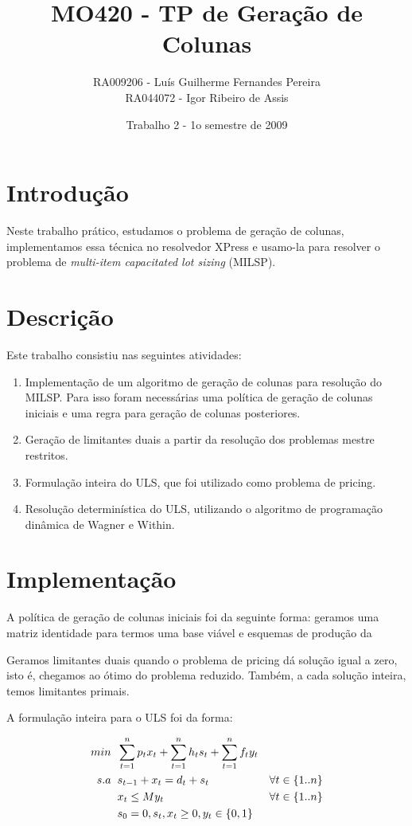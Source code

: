 \documentclass[letterpaper,11pt]{article}
\title{MO420 - TP de Geração de Colunas}
\author{RA009206 - Luís Guilherme Fernandes Pereira \\
RA044072 - Igor Ribeiro de Assis}
\date{Trabalho 2 - 1o semestre de 2009}
\begin{document}
\maketitle

\section{Introdução}

Neste trabalho prático, estudamos o problema de geração de colunas,
implementamos essa técnica no resolvedor XPress e usamo-la para resolver
o problema de \emph{multi-item capacitated lot sizing} (MILSP).

\section{Descrição}
Este trabalho consistiu nas seguintes atividades:

\begin{enumerate}
 \item Implementação de um algoritmo de geração de colunas para
       resolução do MILSP. Para isso foram necessárias uma política de 
       geração de colunas iniciais e uma regra para geração de colunas
       posteriores.
 \item Geração de limitantes duais a partir da resolução dos problemas
       mestre restritos.
 \item Formulação inteira do ULS, que foi utilizado como problema de
       pricing.
 \item Resolução determinística do ULS, utilizando o algoritmo de
       programação dinâmica de Wagner e Within. 
\end{enumerate}

\section{Implementação}
A política de geração de colunas iniciais foi da seguinte forma: geramos
uma matriz identidade para termos uma base viável e esquemas de produção da

Geramos limitantes duais quando o problema de pricing dá solução igual a
zero, isto é, chegamos ao ótimo do problema reduzido. Também, a cada
solução inteira, temos limitantes primais.

A formulação inteira para o ULS foi da forma:

\begin{align}
  min \hspace{0.2cm}&  \sum_{t=1}^n p_tx_t + \sum_{t=1}^n h_ts_t + \sum_{t=1}^n
  f_ty_t \notag\\
  s.a \hspace{0.2cm}&  s_{t-1} + x_t = d_t + s_t &\forall t \in \{1..n\} \notag\\
      &  x_{t} \leq My_t &\forall t \in \{1..n\} \notag\\
      &  s_0 = 0, s_t, x_t \geq 0, y_t \in \{0,1\} \notag
\end{align}
\end{document}
